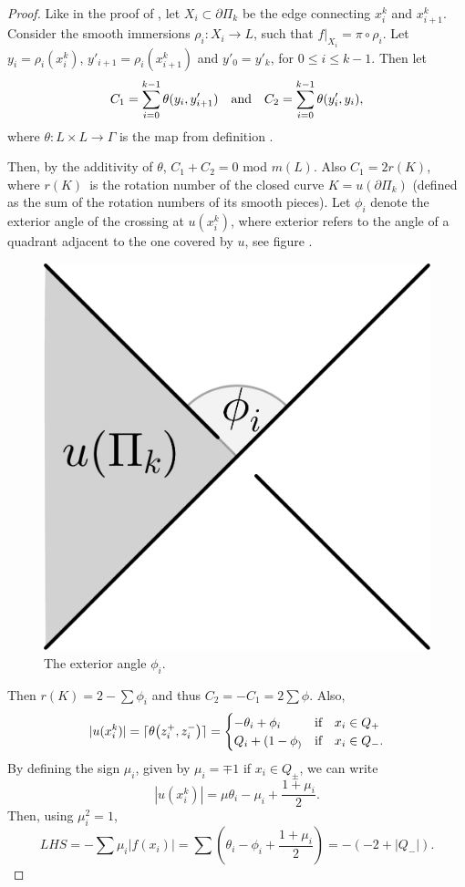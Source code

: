 \begin{proof}
Like in the proof of , let $X_i \subset \partial \Pi_k$ be the
edge connecting $x^k_i$ and $x^k_{i+1}$. 
Consider the smooth immersions $\rho_i : X_i \to L$, such that $f|_{X_i} = \pi
\circ \rho_i$. Let $y_i = \rho_i(x^k_i)$, $y'_{i+1} = \rho_i(x^k_{i+1})$ and
$y'_0 = y'_k$, for $0 \le i \le k-1$. Then let
\[ C_1 = \sum_{i=0}^{k-1} \theta(y_i, y'_{i+1}) \quad\text{and}\quad
   C_2 = \sum_{i=0}^{k-1} \theta(y'_i, y_i),  \]
where $\theta : L \times L \to \Gamma$ is the map from definition
.

Then, by the additivity of $\theta$, $C_1 + C_2 = 0$ mod $m(L)$. Also $C_1 = 2 r(K)$, where $r(K)$ is the rotation
number of the closed curve $K = u(\partial \Pi_k)$ (defined as the sum of
the rotation numbers of its smooth pieces). Let $\phi_i$ denote the exterior
angle of the crossing at $u(x^k_i)$, where exterior refers to the
angle of a quadrant adjacent to the one covered by $u$, see figure
.

\begin{figure}
\centering
% 
\includegraphics[width=.25\textwidth]{figs/outer_angle.pdf}
\caption{The exterior angle $\phi_i$.}
\label{fig:outer_angle}
\end{figure}

Then $r(K) = 2 - \sum \phi_i$ and thus $C_2 = -C_1 = 2\sum \phi$. Also,
\[ |u(x^k_i)| = \lceil \theta\qty(z^+_i, z^-_i) \rceil = \begin{cases}  - \theta_i + \phi_i  &\text{if}\quad x_i  \in Q_+ \\
Q_i + (1 - \phi_) &\text{if}\quad x_i \in Q_-. \end{cases}  \]
By defining the sign $\mu_i$, given by $\mu_i = \mp1$ if $x_i \in Q_\pm$, we can
write 
\[ |u(x^k_i)| = \mu \theta_i - \mu_i + \frac{1+\mu_i}{2}. \]
Then, using $\mu_i^2 = 1$,
\[ LHS = - \sum \mu_i |f(x_i)| = \sum (\theta_i - \phi_i +
\frac{1+\mu_i}{2}) = -(-2 + |Q_-|).   \]

\end{proof}


